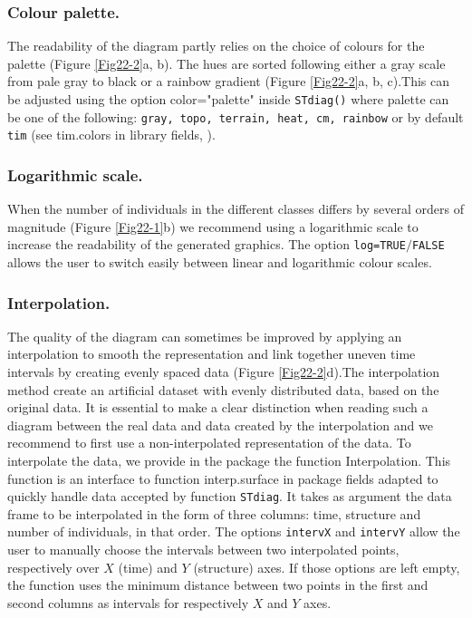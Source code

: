 \subsubsection{Colour palette.}
The readability of the diagram partly relies on the choice of colours for the
palette (Figure \ref{Fig22-2}a, b). The hues are sorted following either a gray scale from
pale gray to black or a rainbow gradient (Figure \ref{Fig22-2}a, b, c).This can be adjusted
using the option color="palette" inside \texttt{STdiag()} where palette can be
one of the following: \texttt{gray, topo, terrain, heat, cm, rainbow} or by
default \texttt{tim} (see tim.colors in library fields, \citealp{furrer2012a}).

\subsubsection{Logarithmic scale.}
When the number of individuals in the different classes differs by several
orders of magnitude (Figure \ref{Fig22-1}b) we recommend using a logarithmic scale to increase
the readability of the generated graphics. The option
\texttt{log=TRUE}$/$\texttt{FALSE} allows the user to switch easily between
linear and logarithmic colour scales.

\subsubsection{Interpolation.}
The quality of the diagram can sometimes be improved by applying an
interpolation to smooth the representation and link together uneven time
intervals by creating evenly spaced data (Figure \ref{Fig22-2}d).The interpolation method
create an artificial dataset with evenly distributed data, based on the original
data. It is essential to make a clear distinction when reading such a diagram
between the real data and data created by the interpolation and we recommend to
first use a non-interpolated representation of the data. To interpolate the
data, we provide in the package the function Interpolation. This function is an
interface to function interp.surface in package fields adapted to quickly handle
data accepted by function \texttt{STdiag}. It takes as argument the data frame
to be interpolated in the form of three columns: time, structure and number of
individuals, in that order. The options \texttt{intervX} and \texttt{intervY} allow the user to
manually choose the intervals between two interpolated points, respectively over
$X$ (time) and $Y$ (structure) axes. If those options are left empty, the
function uses the minimum distance between two points in the first and second columns as
intervals for respectively $X$ and $Y$ axes.

